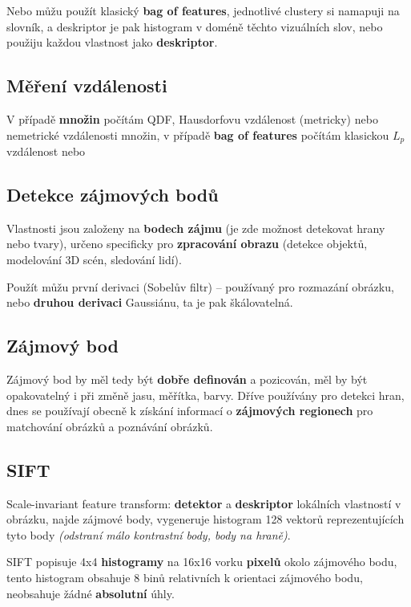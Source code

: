Nebo můžu použít klasický \textbf{bag of features}, jednotlivé clustery si namapuji na slovník, a deskriptor je pak histogram v doméně těchto vizuálních slov, nebo použiju každou vlastnost jako \textbf{deskriptor}.

\subsection{Měření vzdálenosti}

V případě \textbf{množin} počítám QDF, Hausdorfovu vzdálenost (metricky) nebo nemetrické vzdálenosti množin, v případě \textbf{bag of features} počítám klasickou $L_p$ vzdálenost nebo 

\subsection{Detekce zájmových bodů}

Vlastnosti jsou založeny na \textbf{bodech zájmu} (je zde možnost detekovat hrany nebo tvary), určeno specificky pro \textbf{zpracování obrazu} (detekce objektů, modelování 3D scén, sledování lidí).

\vspace{4pt}
\noindent Použít můžu první derivaci (Sobelův filtr) -- používaný pro rozmazání obrázku, nebo \textbf{druhou derivaci} Gaussiánu, ta je pak škálovatelná.

\subsection{Zájmový bod}

Zájmový bod by měl tedy být \textbf{dobře definován} a pozicován, měl by být opakovatelný i při změně jasu, měřítka, barvy. Dříve používány pro detekci hran, dnes se používají obecně k získání informací o \textbf{zájmových regionech} pro matchování obrázků a poznávání obrázků.

\subsection{SIFT}

Scale-invariant feature transform: \textbf{detektor} a \textbf{deskriptor} lokálních vlastností v obrázku, najde zájmové body, vygeneruje histogram 128 vektorů reprezentujících tyto body \textit{(odstraní málo kontrastní body, body na hraně)}.

SIFT popisuje 4x4 \textbf{histogramy} na 16x16 vorku \textbf{pixelů} okolo zájmového bodu, tento histogram obsahuje 8 binů relativních k orientaci zájmového bodu, neobsahuje žádné \textbf{absolutní} úhly.

